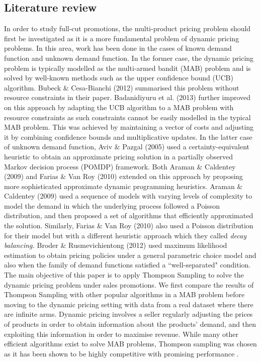 \documentclass[a4paper]{article}
\begin{document}
\subsection{Literature review}
In order to study full-cut promotions, the multi-product pricing problem should first be investigated as it is a more fundamental problem of dynamic pricing problems. In this area, work has been done in the cases of known demand function and unknown demand function. In the former case, the dynamic pricing problem is typically modelled as the multi-armed bandit (MAB) problem and is solved by well-known methods such as the upper confidence bound (UCB) algorithm. Bubeck \& Cesa-Bianchi (2012) summarised this problem without resource constraints in their paper. Badanidiyuru et al. (2013) further improved on this approach by adapting the UCB algorithm to a MAB problem with resource constraints as such constraints cannot be easily modelled in the typical MAB problem. This was achieved by maintaining a vector of costs and adjusting it by combining confidence bounds and multiplicative updates. 
\newline
\newline
In the latter case of unknown demand function, Aviv \& Pazgal (2005) used a certainty-equivalent heuristic to obtain an approximate pricing solution in a partially observed Markov decision process (POMDP) framework. Both Araman \& Caldentey (2009) and Farias \& Van Roy (2010) extended on this approach by proposing more sophisticated approximate dynamic programming heuristics. Araman \& Caldentey (2009) used a sequence of models with varying levels of complexity to model the demand in which the underlying process followed a Poisson distribution, and then proposed a set of algorithms that efficiently approximated the solution. Similarly, Farias \& Van Roy (2010) also used a Poisson distribution for their model but with a different heuristic approach which they called \textit{decay balancing.} Broder \& Rusmevichientong (2012) used maximum likelihood estimation to obtain pricing policies under a general parametric choice model and also when the family of demand functions satisfied a ``well-separated" condition. 
\newline
\newline
The main objective of this paper is to apply Thompson Sampling to solve the dynamic pricing problem under sales promotions. We first compare the results of Thompson Sampling with other popular algorithms in a MAB problem before moving to the dynamic pricing setting with data from a real dataset where there are infinite arms.
\newline
\newline
Dynamic pricing involves a seller regularly adjusting the prices of products in order to obtain information about the products' demand, and then exploiting this information in order to maximise revenue. While many other efficient algorithms exist to solve MAB problems, Thompson sampling was chosen as it has been shown to be highly competitive with promising performance \cite{thomp}. 
\end{document}
